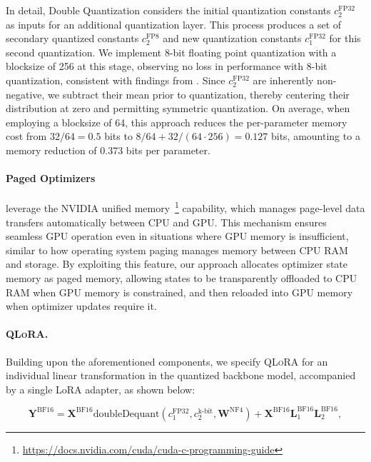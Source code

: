 In detail, Double Quantization considers the initial quantization constants $c_2^{\text{FP32}}$ as inputs for an additional quantization layer. This process produces a set of secondary quantized constants $c_2^{\text{FP8}}$ and new quantization constants $c_1^{\text{FP32}}$ for this second quantization. We implement 8-bit floating point quantization with a blocksize of 256 at this stage, observing no loss in performance with 8-bit quantization, consistent with findings from \citet{dettmers2022case}. Since $c_2^{\text{FP32}}$ are inherently non-negative, we subtract their mean prior to quantization, thereby centering their distribution at zero and permitting symmetric quantization. On average, when employing a blocksize of 64, this approach reduces the per-parameter memory cost from $32/64 = 0.5$ bits to $8/64 + 32/(64\cdot256) = 0.127$ bits, amounting to a memory reduction of 0.373 bits per parameter.

\paragraph{Paged Optimizers} leverage the NVIDIA unified memory~\footnote{\tiny \url{https://docs.nvidia.com/cuda/cuda-c-programming-guide}} capability, which manages page-level data transfers automatically between CPU and GPU. This mechanism ensures seamless GPU operation even in situations where GPU memory is insufficient, similar to how operating system paging manages memory between CPU RAM and storage. By exploiting this feature, our approach allocates optimizer state memory as paged memory, allowing states to be transparently offloaded to CPU RAM when GPU memory is constrained, and then reloaded into GPU memory when optimizer updates require it.

\paragraph{\textsc{QLoRA}.} Building upon the aforementioned components, we specify \textsc{QLoRA} for an individual linear transformation in the quantized backbone model, accompanied by a single LoRA adapter, as shown below:

\begin{equation}
    \mathbf{Y}^{\text{BF16}} =  \mathbf{X}^{\text{BF16}} \text{doubleDequant}(c_1^{\text{FP32}}, c_2^{\text{k-bit}}, \mathbf{W}^{\text{NF4}}) + \mathbf{X}^{\text{BF16}}\mathbf{L}^{\text{BF16}}_1\mathbf{L}^{\text{BF16}}_2,
\end{equation}

